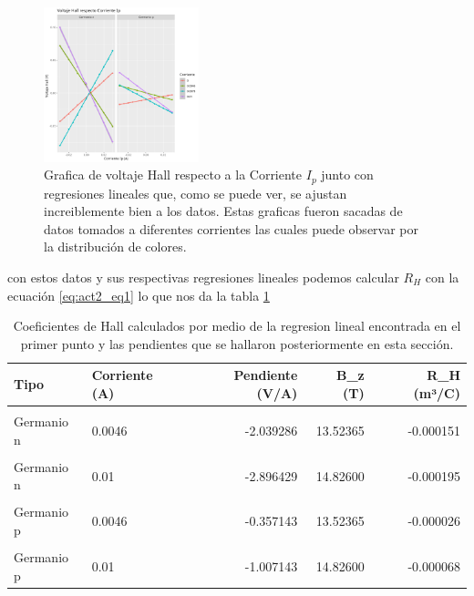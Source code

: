 \documentclass[a4paper, amsfonts, amssymb, amsmath, reprint, showkeys, nofootinbib, twoside]{revtex4-1}
\begin{document}
\begin{figure}
  \begin{center}
    \includegraphics[width=0.4\textwidth]{./img/Act2/VoltajeHallVsCorriente_Ip.png}
  \end{center}
  \caption{Grafica de voltaje Hall respecto a la Corriente $I_p$ junto con regresiones lineales que, como se puede ver,  se ajustan increiblemente bien a los datos. Estas graficas fueron sacadas de datos tomados a diferentes corrientes las cuales puede observar por la distribución de colores.}\label{fig:act2_fig1}
\end{figure}

con estos datos y sus respectivas regresiones lineales podemos calcular $R_H$ con la ecuación \ref{eq:act2_eq1} lo que nos da la tabla \ref{tab:act1_tab1}

\begin{table}[!h]
\centering
  \caption{Coeficientes de Hall calculados por medio de la regresion lineal encontrada en el primer punto y las pendientes que se hallaron posteriormente en esta sección.}
\label{tab:act1_tab1}
\centering
\begin{tabular}[t]{l|l|r|r|r}
\hline
Tipo & Corriente (A) & Pendiente (V/A) & B\_z (T) & R\_H (m³/C)\\
\hline
\cellcolor{gray!10}{Germanio n} & \cellcolor{gray!10}{0} & \cellcolor{gray!10}{1.240659} & \cellcolor{gray!10}{12.41424} & \cellcolor{gray!10}{0.000100}\\
\hline
Germanio n & 0.0046 & -2.039286 & 13.52365 & -0.000151\\
\hline
\cellcolor{gray!10}{Germanio n} & \cellcolor{gray!10}{0.0078} & \cellcolor{gray!10}{2.401648} & \cellcolor{gray!10}{14.29541} & \cellcolor{gray!10}{0.000168}\\
\hline
Germanio n & 0.01 & -2.896429 & 14.82600 & -0.000195\\
\hline
\cellcolor{gray!10}{Germanio p} & \cellcolor{gray!10}{0} & \cellcolor{gray!10}{0.246266} & \cellcolor{gray!10}{12.41424} & \cellcolor{gray!10}{0.000020}\\
\hline
Germanio p & 0.0046 & -0.357143 & 13.52365 & -0.000026\\
\hline
\cellcolor{gray!10}{Germanio p} & \cellcolor{gray!10}{0.0078} & \cellcolor{gray!10}{-0.711538} & \cellcolor{gray!10}{14.29541} & \cellcolor{gray!10}{-0.000050}\\
\hline
Germanio p & 0.01 & -1.007143 & 14.82600 & -0.000068\\
\hline
\end{tabular}
\end{table}
\end{document}
